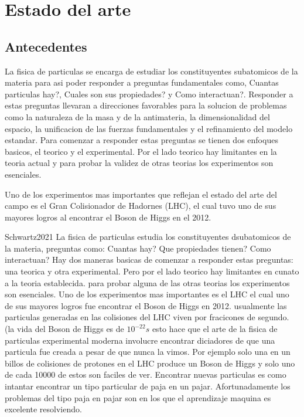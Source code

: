 
\chapter{Estado del arte} %

\label{Chapter2} %


\section{Antecedentes}

La fisica de particulas se encarga de estudiar los constituyentes subatomicos de la materia para asi poder responder a preguntas fundamentales como, Cuantas particulas hay?, Cuales son sus propiedades? y Como interactuan?.  Responder a estas preguntas llevaran a direcciones favorables para la solucion de problemas como la naturaleza de la masa y de la antimateria, la dimensionalidad del espacio, la unificacion de las fuerzas fundamentales y el refinamiento del modelo estandar. 
Para comenzar a responder estas preguntas se tienen dos enfoques basicos, el teorico y el experimental. Por el lado teorico hay limitantes en la teoria actual y para probar la validez de otras teorias los experimentos son esenciales.

Uno de los experimentos mas importantes que reflejan el estado del arte del campo es el Gran Colisionador de Hadornes (LHC), el cual tuvo uno de sus mayores logros al encontrar el Boson de Higgs en el 2012.

Schwartz2021
La fisica de particulas estudia los constituyentes dsubatomicos de la materia, preguntas como: Cuantas hay? Que propiedades tienen? Como interactuan? Hay dos maneras basicas de comenzar a responder estas preguntas: una teorica y otra experimental. Pero por el lado teorico hay limitantes en cunato a la teoria establecida. para probar alguna de las otras teorias los experimentos son esenciales. 
Uno de los experimentos mas importantes es el LHC el cual uno de sus mayores logros fue encontrar el Boson de Higgs en 2012. usualmente las particulas generadas en las colisiones del LHC viven por fracicones de segundo. (la vida del Boson de Higgs es de $10^{-22}s$ esto hace que el arte de la fisica de particulas experimental moderna involucre encontrar diciadores de que una particula fue creada a pesar de que nunca la vimos. 
Por ejemplo solo una en un billos de colisiones de protones en el LHC produce un Boson de Higgs y solo uno de cada 10000 de estos son faciles de ver. 
Encontrar nuevas particulas es como intantar encontrar un tipo particular de paja en un pajar. 
Afortunadamente los problemas del tipo paja en pajar son en los que el aprendizaje maquina es excelente resolviendo.

